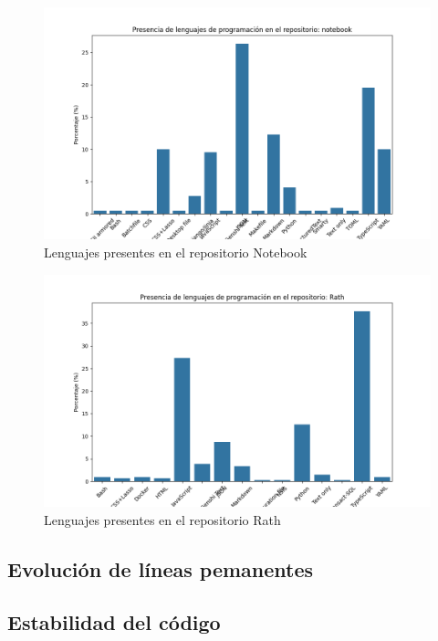 \documentclass[a4paper, 12pt]{book}
\begin{document}
\begin{figure}
  \centering
  \includegraphics[width=16cm, keepaspectratio]{img/languages_notebook.png}
  \caption{Lenguajes presentes en el repositorio Notebook}
  \label{fig:lenguajes-notebook}
\end{figure}

\begin{figure}
  \centering
  \includegraphics[width=16cm, keepaspectratio]{img/languages_rath.png}
  \caption{Lenguajes presentes en el repositorio Rath}
  \label{fig:lenguajes-rath}
\end{figure}

\subsection{Evolución de líneas pemanentes}
\label{subsec:líneas-permanentes}

\subsection{Estabilidad del código}
\label{subsec:estabilidad-código}
\end{document}
